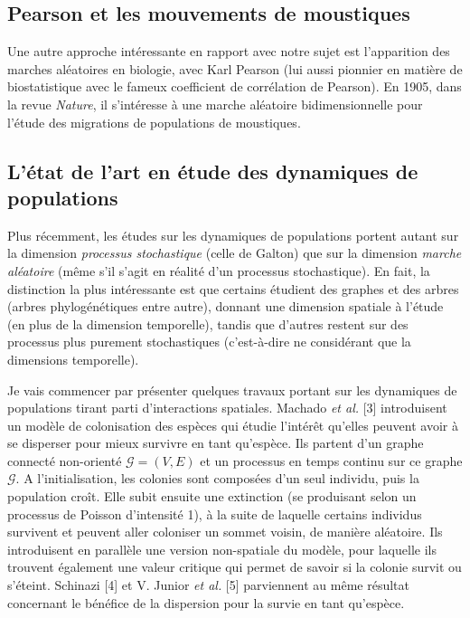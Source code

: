 \documentclass[12pt,a4paper]{article}
\begin{document}
\subsection{Pearson et les mouvements de moustiques}
Une autre approche intéressante en rapport avec notre sujet est l’apparition des marches aléatoires en biologie, avec Karl Pearson (lui aussi pionnier en matière de biostatistique avec le fameux coefficient de corrélation de Pearson). 
En 1905, dans la revue \textit{Nature}, il s’intéresse à une marche aléatoire bidimensionnelle pour l’étude des migrations de populations de moustiques. \par

\subsection{L'état de l'art en étude des dynamiques de populations}
Plus récemment, les études sur les dynamiques de populations portent autant sur la dimension \textit{processus stochastique} (celle de Galton) que sur la dimension \textit{marche aléatoire} (même s’il s’agit en réalité d’un processus stochastique). 
En fait, la distinction la plus intéressante est que certains étudient des graphes et des arbres (arbres phylogénétiques entre autre), donnant une dimension spatiale à l’étude (en plus de la dimension temporelle), tandis que d’autres restent sur des processus plus purement stochastiques (c'est-à-dire ne considérant que la dimensions temporelle). \par

Je vais commencer par présenter quelques travaux portant sur les dynamiques de populations tirant parti d’interactions spatiales. 
Machado \textit{et al.} [3] introduisent un modèle de colonisation des espèces qui étudie l’intérêt qu’elles peuvent avoir à se disperser pour mieux survivre en tant qu’espèce. Ils partent d'un graphe connecté non-orienté $\mathcal{G}=(V,E)$ et un processus en temps continu sur ce graphe $\mathcal{G}$. A l’initialisation, les colonies sont composées d’un seul individu, puis la population croît. Elle subit ensuite une extinction (se produisant selon un processus de Poisson d’intensité 1), à la suite de laquelle certains individus survivent et peuvent aller coloniser un sommet voisin, de manière aléatoire. Ils introduisent en parallèle une version non-spatiale du modèle, pour laquelle ils trouvent également une valeur critique qui permet de savoir si la colonie survit ou s’éteint. 
Schinazi [4] et V. Junior \textit{et al.} [5] parviennent au même résultat concernant le bénéfice de la dispersion pour la survie en tant qu’espèce. \par
\end{document}
